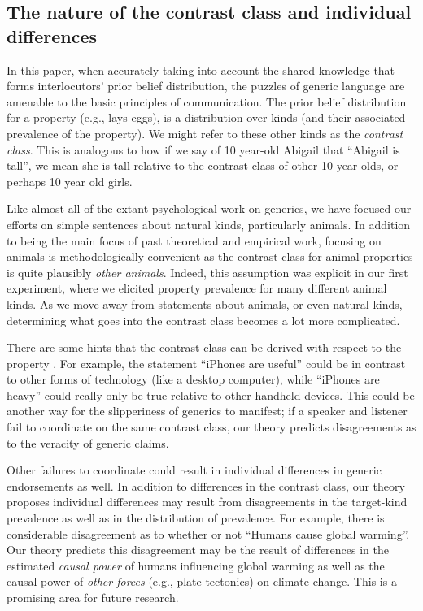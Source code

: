 \documentclass[12pt,letterpaper]{article}
\begin{document}
\subsection*{The nature of the contrast class and individual differences}

In this paper, when accurately taking into account the shared knowledge that forms interlocutors' prior belief distribution, the puzzles of generic language are amenable to the basic principles of communication.
The prior belief distribution for a property (e.g., lays eggs), is a distribution over kinds (and their associated prevalence of the property).
We might refer to these other kinds as the \emph{contrast class}.
This is analogous to how if we say of 10 year-old Abigail that ``Abigail is tall'', we mean she is tall relative to the contrast class of other 10 year olds, or perhaps 10 year old girls.

Like almost all of the extant psychological work on generics, we have focused our efforts on simple sentences about natural kinds, particularly animals.
In addition to being the main focus of past theoretical and empirical work, focusing on animals is methodologically convenient as the contrast class for animal properties is quite plausibly \emph{other animals}.
Indeed, this assumption was explicit in our first experiment, where we elicited  property prevalence for many different animal kinds. 
As we move away from statements about animals, or even natural kinds, determining what goes into the contrast class becomes a lot more complicated. 

There are some hints that the contrast class can be derived with respect to the property \cite{Keil1979}.
For example, the statement ``iPhones are useful'' could be in contrast to other forms of technology (like a desktop computer), while ``iPhones are heavy'' could really only be true relative to other handheld devices.
This could be another way for the slipperiness of generics to manifest; if a speaker and listener fail to coordinate on the same contrast class, our theory predicts disagreements as to the veracity of generic claims.

Other failures to coordinate could result in individual differences in generic endorsements as well.
In addition to differences in the contrast class, our theory proposes individual differences may result from disagreements in the target-kind prevalence as well as in the distribution of prevalence.
For example, there is considerable disagreement as to whether or not ``Humans cause global warming''.
Our theory predicts this disagreement may be the result of differences in the estimated \emph{causal power} of humans influencing global warming as well as the causal power of \emph{other forces} (e.g., plate tectonics) on climate change.
This is a promising area for future research.
\end{document}
